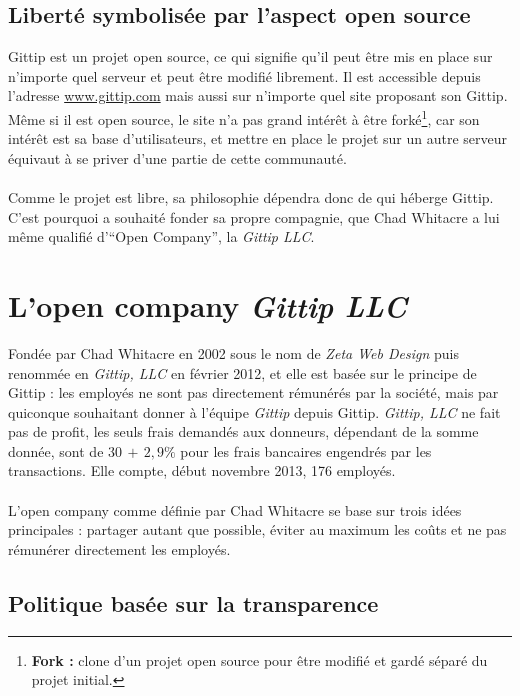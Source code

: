     \subsection{Liberté symbolisée par l'aspect open source}

Gittip est un projet open source, ce qui signifie qu'il peut être mis en place
sur n'importe quel serveur et peut être modifié librement.  Il est accessible
depuis l'adresse \url{www.gittip.com} mais aussi sur n'importe quel site
proposant son Gittip. Même si il est open source, le site n'a pas
grand intérêt à être forké\footnote{\textbf{Fork :} clone d'un projet open
source pour être modifié et gardé séparé du projet initial.}, car son intérêt
est sa base d'utilisateurs, et mettre en place le projet sur un autre serveur
équivaut à se priver d'une partie de cette communauté.

\paragraph{}
Comme le projet est libre, sa philosophie dépendra donc de qui héberge Gittip.
C'est pourquoi  a souhaité fonder sa propre compagnie, que Chad
Whitacre a lui même qualifié d'``Open Company'', la \emph{Gittip LLC}.


    \section{L'open company \emph{Gittip LLC}}

Fondée par Chad Whitacre en 2002 sous le nom de \emph{Zeta Web Design} puis
renommée en \emph{Gittip, LLC} en février 2012, et elle est basée sur le
principe de Gittip : les employés ne sont pas directement rémunérés par la
société, mais par quiconque souhaitant donner à l'équipe \emph{Gittip} depuis
Gittip. \emph{Gittip, LLC} ne fait pas de profit, les seuls frais demandés aux
donneurs, dépendant de la somme donnée, sont de $30$\textcent $\, + \, 2,9\%{}$
pour les frais bancaires engendrés par les transactions. Elle compte,
début novembre 2013, 176 employés.

\paragraph{}
L'open company comme définie par Chad Whitacre se base sur trois idées
principales : partager autant que possible, éviter au maximum les coûts et ne
pas rémunérer directement les employés.

    \subsection{Politique basée sur la transparence}

